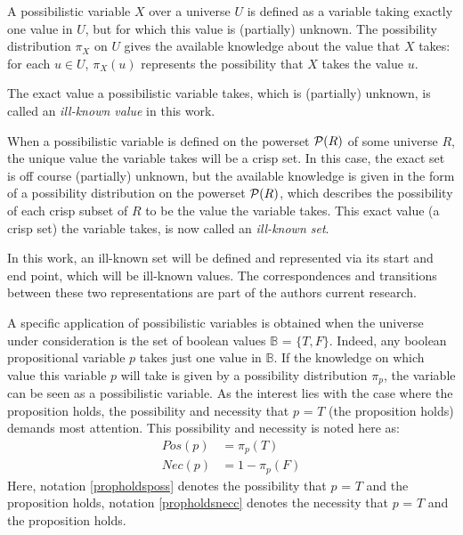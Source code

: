 \begin{definition}
A possibilistic variable $X$ over a universe $U$ is defined as a variable taking exactly one value in $U$, but for which this value is (partially) unknown. The possibility distribution $\pi_X$ on $U$ gives the available knowledge about the value that $X$ takes: for each $u\in U$, $\pi_X(u)$ represents the possibility that $X$ takes the value $u$.
\end{definition}

The exact value a possibilistic variable takes, which is (partially) unknown, is called an \emph{ill-known value} in this work\cite{Dubois88b}.

When a possibilistic variable is defined on the powerset $\mathcal{P}(R)$ of some universe $R$, the unique value the variable takes will be a crisp set. In this case, the exact set is off course (partially) unknown, but the available knowledge is given in the form of a possibility distribution on the powerset $\mathcal{P}(R)$, which describes the possibility of each crisp subset of $R$ to be the value the variable takes. This exact value (a crisp set) the variable takes, is now called an \emph{ill-known set}\cite{Dubois88b}.

In this work, an ill-known set will be defined and represented via its start and end point, which will be ill-known values. The correspondences and transitions between these two representations are part of the authors current research.



A specific application of possibilistic variables is obtained when the universe under consideration is the set of boolean values $\mathbb{B}$ = $\{T,F\}$. Indeed, any boolean propositional variable $p$ takes just one value in $\mathbb{B}$. If the knowledge on which value this variable $p$ will take is given by a possibility distribution $\pi_p$, the variable can be seen as a possibilistic variable. As the interest lies with the case where the proposition holds, the possibility and necessity that $p$ = $T$ (the proposition holds) demands most attention. This possibility and necessity is noted here as:
\begin{align}
Pos(p) & = \pi_p(T) \label{propholdsposs} \\
Nec(p) & = 1-\pi_p(F) \label{propholdsnecc}
\end{align}
Here, notation \ref{propholdsposs} denotes the possibility that $p$ = $T$ and the proposition holds, notation \ref{propholdsnecc} denotes the necessity that $p$ = $T$ and the proposition holds.

